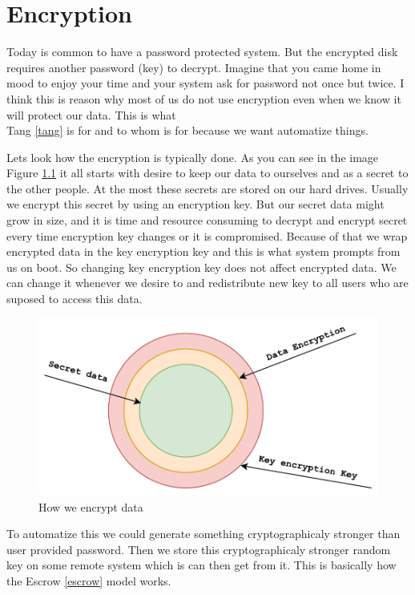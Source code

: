 \documentclass[../xdudla00-porting-Tang-to-Open-WRT.tex]{subfiles}
\begin{document}
\chapter{Encryption}\label{encryption}

Today is common to have a password protected system.
But the encrypted disk requires another password (key) to decrypt.
Imagine that you came home in mood to enjoy your time and your system ask for password not once but twice.
I think this is reason why most of us do not use encryption even when we know it will protect our data.
This is what \\Tang \ref{tang} is for and to whom is for because we want automatize things.

Lets look how the encryption is typically done.
As you can see in the image Figure \ref{fig:encdata} it all starts with desire to keep our data to ourselves and as a secret to the other people.
At the most these secrets are stored on our hard drives.
Usually we encrypt this secret by using an encryption key.
But our secret data might grow in size, and it is time and resource consuming to decrypt and encrypt secret every time encryption key changes or it is compromised.
Because of that we wrap encrypted data in the key encryption key and this is what system prompts from us on boot.
So changing key encryption key does not affect encrypted data.
We can change it whenever we desire to and redistribute new key to all users who are suposed to access this data.

\begin{figure}[h]
    \centering
    \includegraphics[scale=0.7]{../figures/how_we_encrypt_data.pdf}
    \caption{How we encrypt data}
    \label{fig:encdata}
\end{figure}

To automatize this we could generate something cryptographicaly stronger than user provided password.
Then we store this cryptographicaly stronger random key on some remote system which is can then get from it.
This is basically how the Escrow \ref{escrow} model works.
\end{document}
